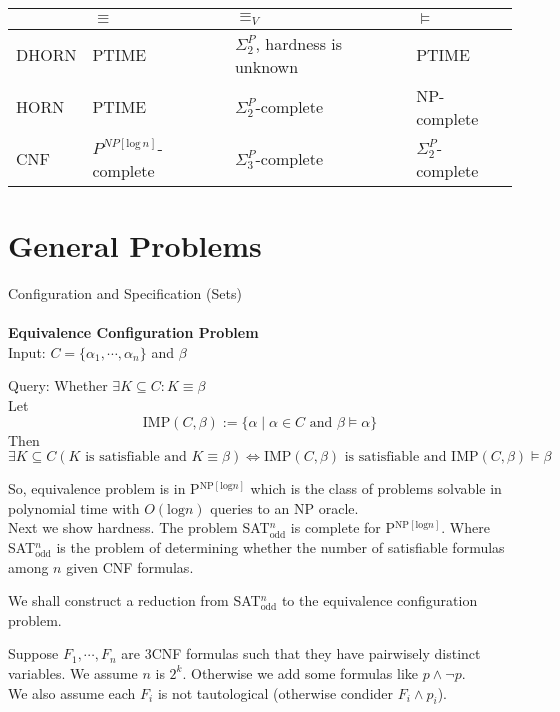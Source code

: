 \documentclass[12pt]{article}
\begin{document}
\begin{tabular}{l|l|l|l}
& $\equiv$ & $\equiv_V$ & $\models$\\ \hline
DHORN & PTIME & $\Sigma_2^P$, hardness is unknown & PTIME \\ \hline
HORN & PTIME & $\Sigma_2^P$-complete & NP-complete\\ \hline
CNF & $P^{NP[\text{log}\, n]}$-complete & $\Sigma_3^P$-complete & $\Sigma_2^P$-complete
\end{tabular}


\section{General Problems}

Configuration and Specification (Sets)\\ \ \\

{\bf Equivalence Configuration Problem}\\

Input: $C=\{\alpha_1,\cdots,\alpha_n\}$ and $\beta$

Query: Whether $\exists K\subseteq C: K\equiv \beta$\\

Let
$$\mbox{IMP}(C,\beta):=\{\alpha\mid \alpha\in C \mbox{ and }\beta\models \alpha\}$$
Then
$$\exists K\subseteq  C(K \text{ is satisfiable and } K\equiv \beta)\Longleftrightarrow\mbox{IMP}(C,\beta) \text{ is satisfiable and IMP}(C,\beta)\models \beta$$

So, equivalence problem is in P$^{\text{NP}[\text{log} n]}$ which is the class of problems solvable in polynomial time with $O(\text{log}n)$ queries to an NP oracle.\\

Next we show hardness. The problem SAT$^n_{\text{odd}}$ is complete for P$^{\text{NP}[\text{log} n]}$. Where SAT$^n_{\text{odd}}$ is the problem of determining whether the number of satisfiable formulas among $n$ given CNF formulas.

We shall construct a reduction from SAT$^n_{\text{odd}}$ to the equivalence configuration problem. 

Suppose $F_1,\cdots, F_n$ are 3CNF formulas such that they have pairwisely distinct variables. We assume $n$ is $2^k$. Otherwise we add some formulas like $p\wedge \neg p$. \\

We also assume each $F_i$ is not tautological (otherwise condider $F_i\wedge p_i$).\\ 
\end{document}
